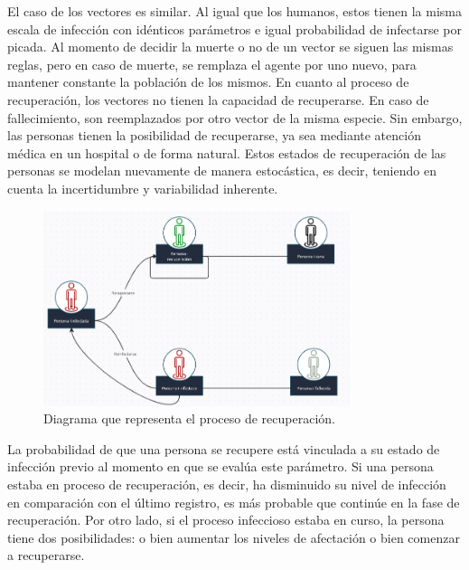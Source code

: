 El caso de los vectores es similar. Al igual que los humanos, estos tienen la misma escala de infección con 
idénticos parámetros e igual probabilidad de infectarse por picada. Al momento de decidir la muerte o no
de un vector se siguen las mismas reglas, pero en caso de muerte, se remplaza el agente por uno nuevo, para 
mantener constante la población de los mismos.
En cuanto al proceso de recuperación, los vectores no tienen la capacidad de recuperarse. En caso de 
fallecimiento, son reemplazados por otro vector de la misma especie. Sin embargo, las personas tienen la 
posibilidad de recuperarse, ya sea mediante atención médica en un hospital o de forma natural. Estos estados 
de recuperación de las personas se modelan nuevamente de manera estocástica, es decir, teniendo en cuenta la 
incertidumbre y variabilidad inherente.

\newpage
\begin{figure}[htb]
    \centering
    \includegraphics[width=0.8\textwidth]{Graphics/Diagrama_Recuperacion.png}
    \caption{Diagrama que representa el proceso de recuperación.}
\end{figure}


La probabilidad de que una persona se recupere está vinculada a su estado de infección previo al momento en 
que se evalúa este parámetro. Si una persona estaba en proceso de recuperación, es decir, ha disminuido su 
nivel de infección en comparación con el último registro, es más probable que continúe en la fase de 
recuperación. Por otro lado, si el proceso infeccioso estaba en curso, la persona tiene dos posibilidades: 
o bien aumentar los niveles de afectación o bien comenzar a recuperarse.







